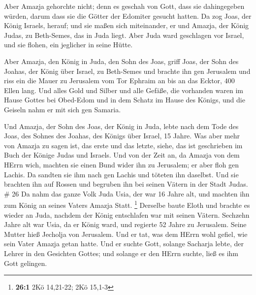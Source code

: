  Aber Amazja gehorchte nicht; denn es geschah von Gott,
dass sie dahingegeben würden, darum dass sie die Götter der Edomiter
gesucht hatten.  Da zog Joas, der König Israels, herauf;
und sie maßen sich miteinander, er und Amazja, der König Judas, zu
Beth-Semes, das in Juda liegt.  Aber Juda ward geschlagen
vor Israel, und sie flohen, ein jeglicher in seine Hütte.

 Aber Amazja, den König in Juda, den Sohn des Joas, griff
Joas, der Sohn des Joahas, der König über Israel, zu Beth-Semes und
brachte ihn gen Jerusalem und riss ein die Mauer zu Jerusalem vom Tor
Ephraim an bis an das Ecktor, 400 Ellen lang.  Und alles
Gold und Silber und alle Gefäße, die vorhanden waren im Hause Gottes bei
Obed-Edom und in dem Schatz im Hause des Königs, und die Geiseln nahm er
mit sich gen Samaria.

 Und Amazja, der Sohn des Joas, der König in Juda, lebte
nach dem Tode des Joas, des Sohnes des Joahas, des Königs über Israel,
15 Jahre.  Was aber mehr von Amazja zu sagen ist, das erste
und das letzte, siehe, das ist geschrieben im Buch der Könige Judas und
Israels.  Und von der Zeit an, da Amazja von dem HErrn
wich, machten sie einen Bund wider ihn zu Jerusalem; er aber floh gen
Lachis. Da sandten sie ihm nach gen Lachis und töteten ihn daselbst.
 Und sie brachten ihn auf Rossen und begruben ihn bei
seinen Vätern in der Stadt Judas. \# 26  Da nahm das ganze
Volk Juda Usia, der war 16 Jahre alt, und machten ihn zum König an
seines Vaters Amazja Statt. \footnote{\textbf{26:1} 2Kö 14,21-22; 2Kö
  15,1-3}  Derselbe baute Eloth und brachte es wieder an
Juda, nachdem der König entschlafen war mit seinen Vätern. 
Sechzehn Jahre alt war Usia, da er König ward, und regierte 52 Jahre zu
Jerusalem. Seine Mutter hieß Jecholja von Jerusalem.  Und er
tat, was dem HErrn wohl gefiel, wie sein Vater Amazja getan hatte.
 Und er suchte Gott, solange Sacharja lebte, der Lehrer in
den Gesichten Gottes; und solange er den HErrn suchte, ließ es ihm Gott
gelingen.

